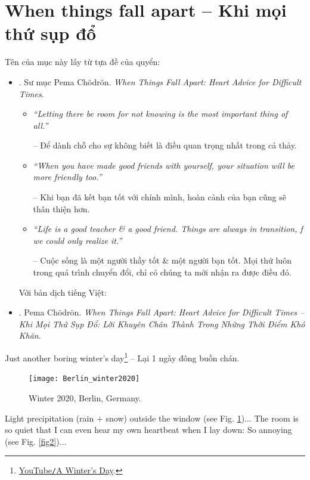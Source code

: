 \documentclass[12pt,twoside]{book}
\begin{document}
\section{When things fall apart -- Khi mọi thứ sụp đổ}
Tên của mục này lấy từ tựa đề của quyển:
\begin{itemize}
	\item \cite{Chodron_fall_apart}. Sư mục {\sc Pema Ch\"odr\"on}. {\it When Things Fall Apart: Heart Advice for Difficult Times}.
	\begin{itemize}
		\item {\it``Letting there be room for not knowing is the most important thing of all.''}
		
		-- Để dành chỗ cho sự không biết là điều quan trọng nhất trong cả thảy.
		
		\item {\it``When you have made good friends with yourself, your situation will be more friendly too.''}
		
		-- Khi bạn đã kết bạn tốt với chính mình, hoàn cảnh của bạn cũng sẽ thân thiện hơn.
		
		\item {\it``Life is a good teacher \& a good friend. Things are always in transition, f we could only realize it.''}
		
		-- Cuộc sống là một người thầy tốt \& một người bạn tốt. Mọi thứ luôn trong quá trình chuyển đổi, chỉ có chúng ta mới nhận ra được điều đó.
	\end{itemize}
	Với bản dịch tiếng Việt:
	\item \cite{Chodron_fall_apart_VN}. {\sc Pema Ch\"odr\"on}. {\it When Things Fall Apart: Heart Advice for Difficult Times -- Khi Mọi Thứ Sụp Đổ: Lời Khuyên Chân Thành Trong Những Thời Điểm Khó Khăn}.
\end{itemize}
Just another boring winter's day\footnote{\href{https://www.youtube.com/watch?v=g1ucAANctmk}{YouTube{\tt/}A Winter's Day}.} -- Lại 1 ngày đông buồn chán.
\begin{figure}[H]
	\centering
	\texttt{[image: Berlin\_winter2020]}
	\caption{Winter 2020, Berlin, Germany.}
	\label{fig1}
\end{figure}
Light precipitation (rain $+$ snow) outside the window (see Fig. \ref{fig1})$\ldots$ The room is so quiet that I can even hear my own heartbeat when I lay down: So annoying (see Fig. \ref{fig2})$\ldots$
\end{document}
